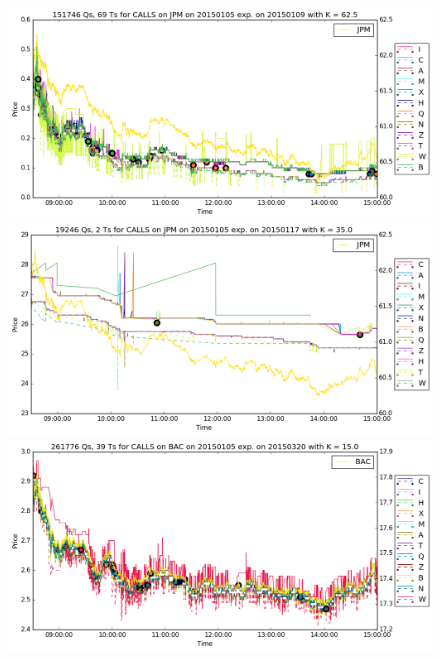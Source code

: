 \documentclass[a4paper,12pt]{article}
\theoremstyle{plain}
\theoremstyle{definition}
\begin{document}
\vspace*{\fill}
\begin{figure}[H]
\begin{center}
 \includegraphics[width=\linewidth]{figures/contract_pics/JPM_top.png}
 \endminipage
 \hspace{3mm}
 \includegraphics[width=\linewidth]{figures/contract_pics/JPM_middle.png}
 \endminipage\\
  \vspace{5mm}
 \includegraphics[width=\linewidth]{figures/contract_pics/BAC_top.png}
 \endminipage
 \hspace{3mm}

\end{center}
\end{figure}
\end{document}

